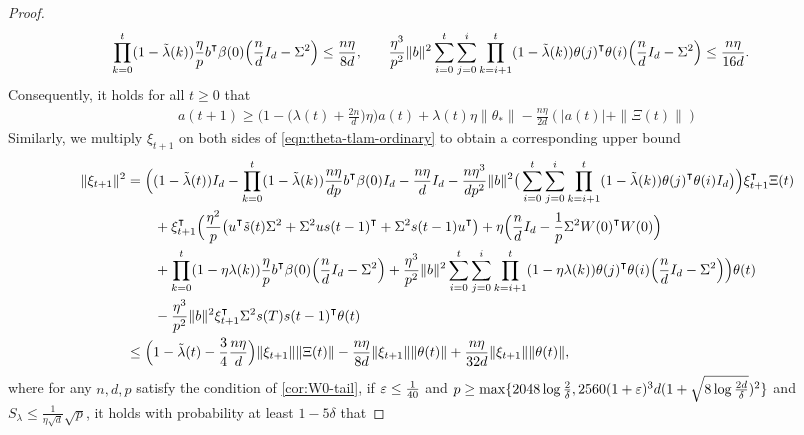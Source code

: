 \begin{proof}
\begin{align*}
         \prod_{k=0}^t (1-\tilde\lambda(k))\frac{\eta}{p}b\transpose\beta(0) \Big(\frac{n}{d}I_d - \Sigma^2\Big) \leq \frac{n\eta}{8d},& \qquad \frac{\eta^3}{p^2}\|b\|^2\sum_{i=0}^t\sum_{j=0}^i\prod_{k=i+1}^t(1-\tilde\lambda(k))\theta(j)\transpose \theta(i) \Big(\frac{n}{d}I_d-\Sigma^2\Big) \leq \frac{n\eta}{16d}.
    \end{align*}
    Consequently, it holds for all $t\geq 0$ that 
    \begin{align*}
        a(t+1)\geq \Big(1-\Big(\lambda(t)+\frac{2n}{d}\Big)\eta\Big)a(t)+\lambda(t)\eta\|\theta_*\| - \frac{n\eta}{2d} (|a(t)| + \|\Xi(t)\|)
    \end{align*}
    Similarly, we multiply $\xi_{t+1}$ on both sides of \cref{eqn:theta-tlam-ordinary} to obtain a corresponding upper bound
    \begin{align}\label{eqn:xi_tlam-ordinary}
        \begin{split}
            \|\xi_{t+1}\|^2 & = \Big((1-\tlam(t))I_d -\prod_{k=0}^t(1-\tlam(k))\frac{n\eta}{dp}b\transpose\beta(0) I_d - \frac{n\eta}{d} I_d - \frac{n\eta^3}{dp^2}\|b\|^2\big(\sum_{i=0}^t\sum_{j=0}^i\prod_{k=i+1}^t(1-\tlam(k))\theta(j)\transpose \theta(i) I_d \big)\Big) \xi_{t+1}\transpose \Xi(t) \\
            & \qquad + \xi_{t+1}\transpose\Big(\frac{\eta^2}{p}\big(u\transpose \tilde{s}(t) \Sigma^2 + \Sigma^2 u s(t-1)\transpose + \Sigma^2 s(t-1)u\transpose\big) + \eta\Big(\frac{n}{d}I_d - \frac{1}{p}\Sigma^2 W(0)\transpose W(0)\Big)  \\
            & \qquad + \prod_{k=0}^t(1-\eta\lambda(k))\frac{\eta}{p}b\transpose\beta(0) \Big(\frac{n}{d}I_d - \Sigma^2\Big) + \frac{\eta^3}{p^2}\|b\|^2\sum_{i=0}^t\sum_{j=0}^i\prod_{k=i+1}^t(1-\eta\lambda(k))\theta(j)\transpose \theta(i) \Big(\frac{n}{d}I_d-\Sigma^2\Big) \Big)\theta(t) \\
            & \qquad -\frac{\eta^3}{p^2}\|b\|^2 \xi_{t+1}\transpose \Sigma^2 s(T)s(t-1)\transpose \theta(t) \\
            & \leq \Big(1-\tlam(t)-\frac{3}{4}\frac{n\eta}{d}\Big)\|\xi_{t+1}\| \|\Xi(t)\| - \frac{n\eta}{8d}\|\xi_{t+1}\|\|\theta(t)\| + \frac{n\eta}{32d} \|\xi_{t+1}\|\|\theta(t)\|,
        \end{split}
    \end{align}
    where for any $n,d,p$ satisfy the condition of \cref{cor:W0-tail}, if $\varepsilon\leq \frac{1}{40}$ and $p\geq \max\{2048\log\frac{2}{\delta},2560(1+\varepsilon)^3d(1+\sqrt{8\log\frac{2d}{\delta}})^2\}$ and $S_\lambda\leq \frac{1}{\eta\sqrt{d}}\sqrt{p}$, it holds with probability at least $1-5\delta$ that

\end{proof}
